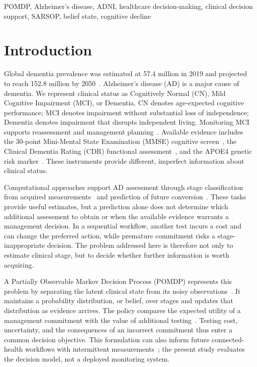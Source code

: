 \documentclass[conference,a4paper]{IEEEtran}
\begin{document}
\begin{IEEEkeywords}
POMDP, Alzheimer's disease, ADNI, healthcare decision-making,
clinical decision support, SARSOP, belief state, cognitive decline
\end{IEEEkeywords}

\section{Introduction}

Global dementia prevalence was estimated at 57.4 million in 2019 and
projected to reach 152.8 million by 2050~\cite{nichols2022}.
Alzheimer's disease (AD) is a major cause of dementia. We represent
clinical status as Cognitively Normal (CN), Mild Cognitive Impairment
(MCI), or Dementia. CN denotes age-expected cognitive performance;
MCI denotes impairment without substantial loss of independence;
Dementia denotes impairment that disrupts independent living.
Monitoring MCI supports reassessment and management
planning~\cite{petersen2018mci}. Available evidence includes the
30-point Mini-Mental State Examination (MMSE) cognitive
screen~\cite{folstein1975mmse}, the Clinical Dementia Rating (CDR)
functional assessment~\cite{hughes1982cdr}, and the APOE4 genetic
risk marker~\cite{corder1993apoe}. These instruments provide
different, imperfect information about clinical status.

Computational approaches support AD assessment through stage
classification from acquired measurements~\cite{wen2020convolutional}
and prediction of future conversion~\cite{grueso2021machine}.
These tasks provide useful estimates, but a prediction alone does not
determine which additional assessment to obtain or when the available
evidence warrants a management decision. In a sequential workflow,
another test incurs a cost and can change the preferred action,
while premature commitment risks a stage-inappropriate decision.
The problem addressed here is therefore not only to estimate clinical
stage, but to decide whether further information is worth acquiring.

A Partially Observable Markov Decision Process
(POMDP) represents this problem by separating the latent clinical
state from its noisy observations~\cite{kaelbling,cassandra}.
It maintains a probability distribution, or belief, over stages and
updates that distribution as evidence arrives. The policy compares
the expected utility of a management commitment with the value of
additional testing~\cite{hauskrecht,monahan}. Testing cost, uncertainty,
and the consequences of an incorrect commitment thus enter a common
decision objective. This formulation can also inform future
connected-health workflows with intermittent
measurements~\cite{arrayyan2024iomt}; the present study evaluates the
decision model, not a deployed monitoring system.
\end{document}
